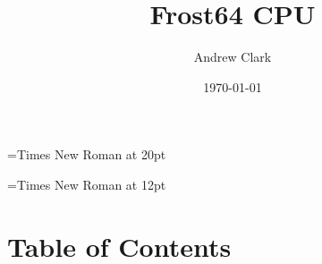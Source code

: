 \documentclass{article}
\begin{document}
	\font\titlefont={Times New Roman} at 20pt
	\title{{\titlefont Frost64 CPU}}

	\font\bottomtextfont={Times New Roman} at 12pt
	\date{{\bottomtextfont} \today}
	\author{{\bottomtextfont Andrew Clark}}

	\setmainfont{Times New Roman}
	\setmonofont{Courier New}

	\maketitle

	\newpage



\section{Table of Contents}
	\tableofcontents
	\newpage
\end{document}
